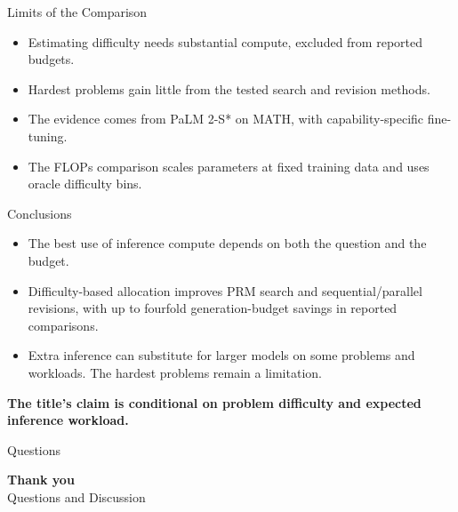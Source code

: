 \documentclass[aspectratio=1610,xcolor=dvipsnames,t]{beamer}
\newcommand{\keyterm}[1]{\textcolor{unirot}{\textbf{#1}}}
\begin{document}
\begin{frame}{Limits of the Comparison}
  \begin{itemize}
    \item Estimating difficulty needs substantial compute, excluded from reported budgets.
    \item Hardest problems gain little from the tested search and revision methods.
    \item The evidence comes from PaLM 2-S* on MATH, with capability-specific fine-tuning.
    \item The FLOPs comparison scales parameters at fixed training data and uses oracle difficulty bins.
  \end{itemize}
\end{frame}

\begin{frame}{Conclusions}
  \begin{itemize}
    \item The best use of inference compute depends on both the question and the budget.
    \item Difficulty-based allocation improves PRM search and sequential/parallel revisions, with up to fourfold generation-budget savings in reported comparisons.
    \item Extra inference can substitute for larger models on some problems and workloads. The hardest problems remain a limitation.
  \end{itemize}
  \par\medskip
  \keyterm{The title's claim is conditional on problem difficulty and expected inference workload.}
\end{frame}

\begin{frame}{Questions}
  \vfill
  \begin{center}
    {\Huge\color{unirot}\textbf{Thank you}}\\[.4cm]
    {\Large Questions and Discussion}
  \end{center}
  \vfill
\end{frame}
\end{document}
